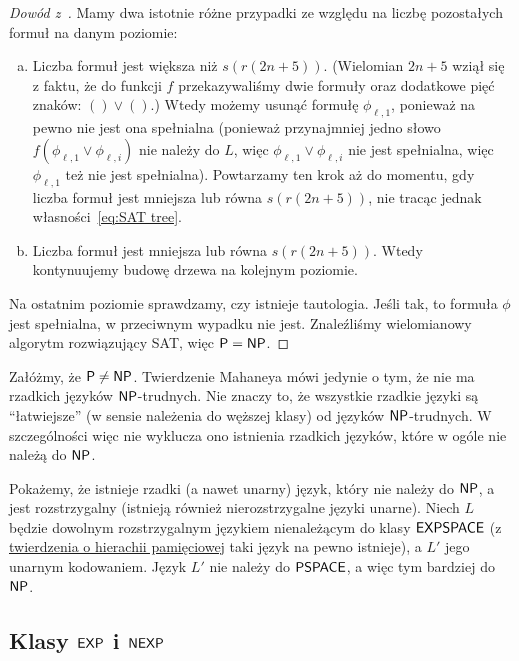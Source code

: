 \begin{proof}[Dowód z~\cite{Grochow}]
    Mamy dwa istotnie różne przypadki ze względu na liczbę pozostałych formuł na danym poziomie:
    \begin{enumerate}[(a)]
        \item Liczba formuł jest większa niż $s(r(2n + 5))$. (Wielomian $2n + 5$ wziął się z faktu, że do funkcji $f$ przekazywaliśmy dwie formuły oraz dodatkowe pięć znaków: $() \lor ()$.)
        Wtedy możemy usunąć formułę $\phi_{\ell, 1}$, ponieważ na pewno nie jest ona spełnialna (ponieważ przynajmniej jedno słowo $f(\phi_{\ell, 1} \lor \phi_{\ell, i})$ nie należy do $L$, więc $\phi_{\ell, 1} \lor \phi_{\ell, i}$ nie jest spełnialna, więc $\phi_{\ell, 1}$ też nie jest spełnialna).
        Powtarzamy ten krok aż do momentu, gdy liczba formuł jest mniejsza lub równa $s(r(2n + 5))$, nie tracąc jednak własności~\ref{eq:SAT tree}.
        \item Liczba formuł jest mniejsza lub równa $s(r(2n + 5))$. Wtedy kontynuujemy budowę drzewa na kolejnym poziomie.
    \end{enumerate}

    Na ostatnim poziomie sprawdzamy, czy istnieje tautologia. Jeśli tak, to formuła $\phi$ jest spełnialna, w przeciwnym wypadku nie jest.
    Znaleźliśmy wielomianowy algorytm rozwiązujący SAT, więc $\textsf{P} = \textsf{NP}$.
\end{proof}

\begin{remark}
    Załóżmy, że $\textsf{P} \neq \textsf{NP}$. Twierdzenie Mahaneya mówi jedynie o tym, że nie ma rzadkich języków $\textsf{NP}$-trudnych. Nie znaczy to, że wszystkie rzadkie języki są \enquote{łatwiejsze} (w sensie należenia do węższej klasy) od języków $\textsf{NP}$-trudnych. W szczególności więc nie wyklucza ono istnienia rzadkich języków, które w ogóle nie należą do $\textsf{NP}$.

    Pokażemy, że istnieje rzadki (a nawet unarny) język, który nie należy do $\textsf{NP}$, a jest rozstrzygalny (istnieją również nierozstrzygalne języki unarne).
    Niech $L$ będzie dowolnym rozstrzygalnym językiem nienależącym do klasy $\textsf{EXPSPACE}$ (z \href{https://en.wikipedia.org/wiki/Space_hierarchy_theorem}{twierdzenia o hierachii pamięciowej} taki język na pewno istnieje), a $L'$ jego unarnym kodowaniem. Język $L'$ nie należy do $\textsf{PSPACE}$, a więc tym bardziej do $\textsf{NP}$.
\end{remark}

\subsection{Klasy $\textsf{EXP}$ i $\textsf{NEXP}$}

